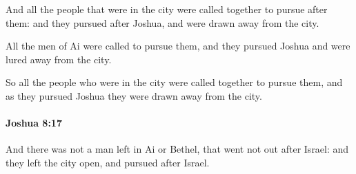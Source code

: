 			\begin{versebox}
					\item[BHS] 
					\item[ASV] And all the people that were in the city were called together to pursue after them: and they pursued after Joshua, and were drawn away from the city.
					\item[NIV] All the men of Ai were called to pursue them, and they pursued Joshua and were lured away from the city.
					\item[NRSV] So all the people who were in the city were called together to pursue them, and as they pursued Joshua they were drawn away from the city.
			\end{versebox}

		\paragraph{Joshua 8:17} %
			\label{JOSHUA-8-17}

			And there was not a man left in Ai or Bethel, that went not out after Israel: and they left the city open, and pursued after Israel.

